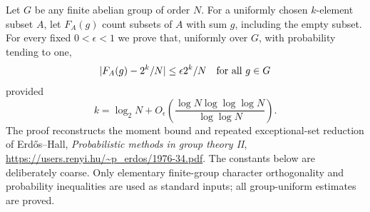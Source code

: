 Let $G$ be any finite abelian group of order $N$. For a uniformly chosen $k$-element subset $A$, let $F_A(g)$ count subsets of $A$ with sum $g$, including the empty subset. For every fixed $0<\epsilon<1$ we prove that, uniformly over $G$, with probability tending to one,
\[
 |F_A(g)-2^k/N|\le\epsilon 2^k/N\quad\hbox{for all }g\in G
\]
provided
\[
 k=\log_2N+O_\epsilon\left(\frac{\log N\log\log\log N}{\log\log N}\right).
\tag{1}
\]
The proof reconstructs the moment bound and repeated exceptional-set reduction of Erd\H{o}s--Hall, \emph{Probabilistic methods in group theory II}, \url{https://users.renyi.hu/~p_erdos/1976-34.pdf}. The constants below are deliberately coarse. Only elementary finite-group character orthogonality and probability inequalities are used as standard inputs; all group-uniform estimates are proved.
